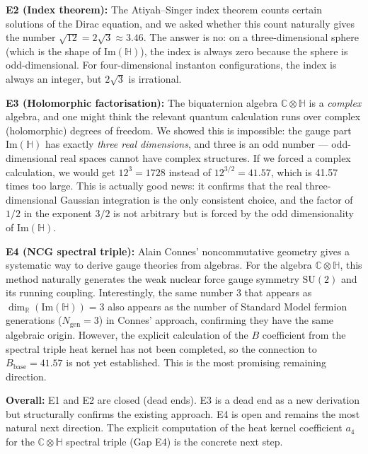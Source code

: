 \documentclass[11pt,a4paper]{article}
\theoremstyle{definition}
\theoremstyle{remark}
\begin{document}
\textbf{E2 (Index theorem):}
The Atiyah--Singer index theorem counts certain solutions of the Dirac equation,
and we asked whether this count naturally gives the number $\sqrt{12} = 2\sqrt{3} \approx 3.46$.
The answer is no: on a three-dimensional sphere (which is the shape of Im$(\mathbb{H})$),
the index is always zero because the sphere is odd-dimensional.
For four-dimensional instanton configurations, the index is always an integer,
but $2\sqrt{3}$ is irrational.

\textbf{E3 (Holomorphic factorisation):}
The biquaternion algebra $\mathbb{C}\otimes\mathbb{H}$ is a \emph{complex} algebra,
and one might think the relevant quantum calculation runs over complex
(holomorphic) degrees of freedom.
We showed this is impossible: the gauge part Im$(\mathbb{H})$ has exactly
\emph{three real dimensions}, and three is an odd number — odd-dimensional
real spaces cannot have complex structures.
If we forced a complex calculation, we would get $12^3 = 1728$ instead of $12^{3/2} = 41.57$,
which is 41.57 times too large.
This is actually good news: it confirms that the real three-dimensional
Gaussian integration is the only consistent choice, and the factor of $1/2$
in the exponent $3/2$ is not arbitrary but is forced by the odd dimensionality of Im$(\mathbb{H})$.

\textbf{E4 (NCG spectral triple):}
Alain Connes' noncommutative geometry gives a systematic way to derive
gauge theories from algebras.
For the algebra $\mathbb{C}\otimes\mathbb{H}$, this method naturally generates
the weak nuclear force gauge symmetry $\mathrm{SU}(2)$ and its running coupling.
Interestingly, the same number 3 that appears as
$\dim_\mathbb{R}(\mathrm{Im}(\mathbb{H})) = 3$ also appears as the number of
Standard Model fermion generations ($N_{\mathrm{gen}} = 3$) in Connes' approach,
confirming they have the same algebraic origin.
However, the explicit calculation of the $B$ coefficient from the spectral
triple heat kernel has not been completed, so the connection to
$B_{\mathrm{base}} = 41.57$ is not yet established.
This is the most promising remaining direction.

\textbf{Overall:}
E1 and E2 are closed (dead ends).
E3 is a dead end as a new derivation but structurally confirms the
existing approach.
E4 is open and remains the most natural next direction.
The explicit computation of the heat kernel coefficient $a_4$ for the
$\mathbb{C}\otimes\mathbb{H}$ spectral triple (Gap E4) is the concrete
next step.

\ifdefined\INCLUDEMODE\else
\end{document}
